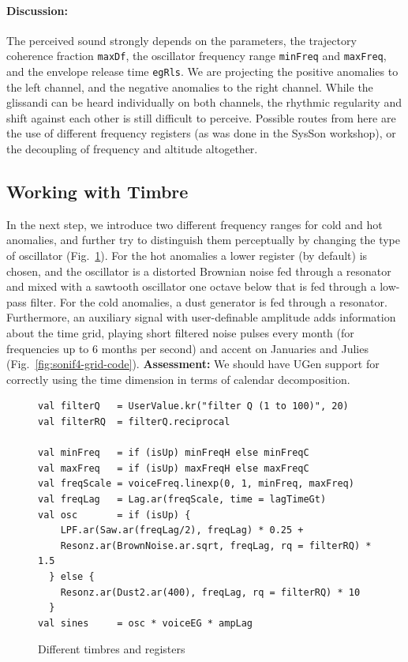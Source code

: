 \documentclass[11pt,a4paper]{article}
\newcommand{\figref}[1]{Fig.~\ref{#1}}
\begin{document}
\paragraph{Discussion:} The perceived sound strongly depends on the parameters, the trajectory coherence fraction \Verb!maxDf!, the oscillator frequency range \Verb!minFreq! and \Verb!maxFreq!, and the envelope release time \Verb!egRls!. We are projecting the positive anomalies to the left channel, and the negative anomalies to the right channel. While the glissandi can be heard individually on both channels, the rhythmic regularity and shift against each other is still difficult to perceive. Possible routes from here are the use of different frequency registers (as was done in the SysSon workshop), or the decoupling of frequency and altitude altogether.

\subsection{Working with Timbre}

In the next step, we introduce two different frequency ranges for cold and hot anomalies, and further try to distinguish them perceptually by changing the type of oscillator (\figref{fig:sonif4-timbre-code}). For the hot anomalies a lower register (by default) is chosen, and the oscillator is a distorted Brownian noise fed through a resonator and mixed with a sawtooth oscillator one octave below that is fed through a low-pass filter. For the cold anomalies, a dust generator is fed through a resonator. Furthermore, an auxiliary signal with user-definable amplitude adds information about the time grid, playing short filtered noise pulses every month (for frequencies up to 6 months per second) and accent on Januaries and Julies (\figref{fig:sonif4-grid-code}). \textbf{Assessment:} We should have UGen support for correctly using the time dimension in terms of calendar decomposition.

\begin{figure}
\begin{lstlisting}[style=scala]
val filterQ   = UserValue.kr("filter Q (1 to 100)", 20)
val filterRQ  = filterQ.reciprocal

val minFreq   = if (isUp) minFreqH else minFreqC
val maxFreq   = if (isUp) maxFreqH else maxFreqC
val freqScale = voiceFreq.linexp(0, 1, minFreq, maxFreq)
val freqLag   = Lag.ar(freqScale, time = lagTimeGt)
val osc       = if (isUp) {
    LPF.ar(Saw.ar(freqLag/2), freqLag) * 0.25 +
    Resonz.ar(BrownNoise.ar.sqrt, freqLag, rq = filterRQ) * 1.5
  } else {
    Resonz.ar(Dust2.ar(400), freqLag, rq = filterRQ) * 10
  }
val sines     = osc * voiceEG * ampLag
\end{lstlisting}
\caption{Different timbres and registers}
\label{fig:sonif4-timbre-code}
\end{figure}
\end{document}
